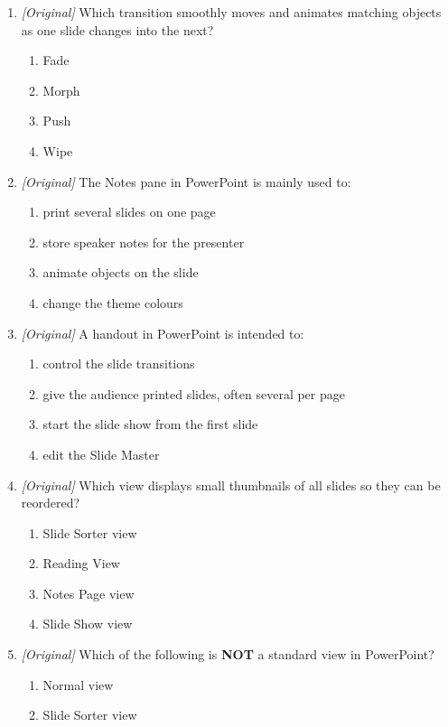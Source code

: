 \begin{enumerate}[label=\textbf{Q\arabic*.}, leftmargin=*]
\begin{enumerate}[label=\Alph*.]
  \end{enumerate}
\item \textit{[Original]} Which transition smoothly moves and animates matching
  objects as one slide changes into the next?
  \begin{enumerate}[label=\Alph*.]
    \item Fade
    \item Morph
    \item Push
    \item Wipe
  \end{enumerate}
\item \textit{[Original]} The Notes pane in PowerPoint is mainly used to:
  \begin{enumerate}[label=\Alph*.]
    \item print several slides on one page
    \item store speaker notes for the presenter
    \item animate objects on the slide
    \item change the theme colours
  \end{enumerate}
\item \textit{[Original]} A handout in PowerPoint is intended to:
  \begin{enumerate}[label=\Alph*.]
    \item control the slide transitions
    \item give the audience printed slides, often several per page
    \item start the slide show from the first slide
    \item edit the Slide Master
  \end{enumerate}
\item \textit{[Original]} Which view displays small thumbnails of all slides so
  they can be reordered?
  \begin{enumerate}[label=\Alph*.]
    \item Slide Sorter view
    \item Reading View
    \item Notes Page view
    \item Slide Show view
  \end{enumerate}
\item \textit{[Original]} Which of the following is \textbf{NOT} a standard view
  in PowerPoint?
  \begin{enumerate}[label=\Alph*.]
    \item Normal view
    \item Slide Sorter view

\end{enumerate}
\end{enumerate}
